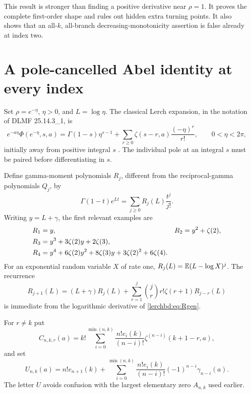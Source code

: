 \begin{remark}
This result is stronger than finding a positive derivative near $\rho=1$. It proves the complete first-order shape and rules out hidden extra turning points. It also shows that an all-$k$, all-branch decreasing-monotonicity assertion is false already at index two.
\end{remark}

\section{A pole-cancelled Abel identity at every index}\label{lerchbd:sec:abel}
Set $\rho=e^{-\eta}$, $\eta>0$, and $L=\log\eta$. The classical Lerch expansion, in the notation of DLMF 25.14.3\_1, is
\begin{equation}\label{lerchbd:eq:classical}
 e^{-a\eta}\Phi(e^{-\eta},s,a)
 =\Gamma(1-s)\eta^{s-1}
  +\sum_{r\ge0}\zeta(s-r,a)\frac{(-\eta)^r}{r!},
 \qquad 0<\eta<2\pi,
\end{equation}
initially away from positive integral $s$ \cite{lerchbd:lerch}. The individual pole at an integral $s$ must be paired before differentiating in $s$.

Define gamma-moment polynomials $R_j$, different from the reciprocal-gamma polynomials $Q_j$, by
\begin{equation}\label{lerchbd:eq:Rgen}
 \Gamma(1-t)e^{Lt}=\sum_{j\ge0}R_j(L)\frac{t^j}{j!}.
\end{equation}
Writing $y=L+\gamma$, the first relevant examples are
\begin{align}
 R_1&=y,& R_2&=y^2+\zeta(2),\notag\\
 R_3&=y^3+3\zeta(2)y+2\zeta(3),\label{lerchbd:eq:Rsmall}\\
 R_4&=y^4+6\zeta(2)y^2+8\zeta(3)y+3\zeta(2)^2+6\zeta(4).\notag
\end{align}
For an exponential random variable $X$ of rate one, $R_j(L)=\mathbb E(L-\log X)^j$. The recurrence
\begin{equation}\label{lerchbd:eq:Rrec}
 R_{j+1}(L)=(L+\gamma)R_j(L)
 +\sum_{r=1}^j\binom jr r!\zeta(r+1)R_{j-r}(L)
\end{equation}
is immediate from the logarithmic derivative of \eqref{lerchbd:eq:Rgen}.

For $r\ne k$ put
\begin{equation}\label{lerchbd:eq:C}
 C_{n,k,r}(a)=k!\sum_{i=0}^{\min(n,k)}
 \frac{n!e_i(k)}{(n-i)!}\zeta^{(n-i)}(k+1-r,a),
\end{equation}
and set
\begin{equation}\label{lerchbd:eq:A}
 U_{n,k}(a)=n!e_{n+1}(k)
 +\sum_{i=0}^{\min(n,k)}\frac{n!e_i(k)}{(n-i)!}
 (-1)^{n-i}\gamma_{n-i}(a).
\end{equation}
The letter $U$ avoids confusion with the largest elementary zero $A_{n,k}$ used earlier.

